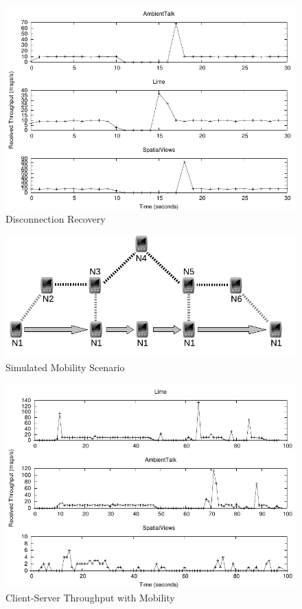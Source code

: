\begin{figure}
\centering
\includegraphics{figures/disconnection.pdf}
\caption{Disconnection Recovery}
\label{fig:disconnection}
\end{figure}

\begin{figure}
\centering
\includegraphics{figures/network.pdf}
\caption{Simulated Mobility Scenario}
\label{fig:network}
\end{figure}

\begin{figure}
\centering
\includegraphics{figures/mobility-results.pdf}
\caption{Client-Server Throughput with Mobility}
\label{fig:mobility-results}
\end{figure}


